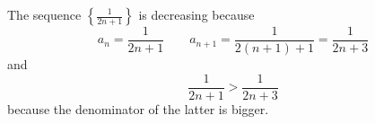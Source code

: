 \begin{frame}
\begin{example}
The sequence $\left\{ \frac{1}{2n+1}\right\}$ is decreasing because
\[
a_n = \frac{1}{2n+1} \qquad a_{n+1} = \frac{1}{2(n+1)+1} = \frac{1}{2n+3}
\]
and 
\[
\frac{1}{2n+1} > \frac{1}{2n+3}
\]
because the denominator of the latter is bigger.
\end{example}
\end{frame}
